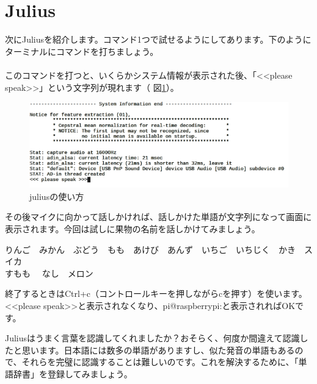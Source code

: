 \section{Julius}\label{Julius}
次にJuliusを紹介します。コマンド1つで試せるようにしてあります。下のようにターミナルにコマンドを打ちましょう。\\
\\
このコマンドを打つと、いくらかシステム情報が表示された後、「<<please speak>>」という文字列が現れます（ 図\ref{juliusの使い方}）。

\begin{figure}[H]
\begin{center}
    \includegraphics[width=\linewidth]{images/chap06/text06-img009.png}
    \caption{juliusの使い方}
    \label{juliusの使い方}
\end{center}
\end{figure}

その後マイクに向かって話しかければ、話しかけた単語が文字列になって画面に表示されます。今回は試しに果物の名前を話しかけてみましょう。
\begin{center}
	りんご　みかん　ぶどう　もも　あけび　あんず　いちご　いちじく　かき　スイカ\\すもも　	なし　メロン
\end{center}
	
終了するときはCtrl+c（コントロールキーを押しながらcを押す）を使います。<<please speak>>と表示されなくなり、pi@raspberrypi:と表示されればOKです。

Juliusはうまく言葉を認識してくれましたか？おそらく、何度か間違えて認識したと思います。日本語には数多の単語がありますし、似た発音の単語もあるので、それらを完璧に認識することは難しいのです。これを解決するために、「単語辞書」を登録してみましょう。\\

\begin{tcolorbox}[title=\useOmetoi]
\begin{enumerate}
\end{enumerate}
\end{tcolorbox}
